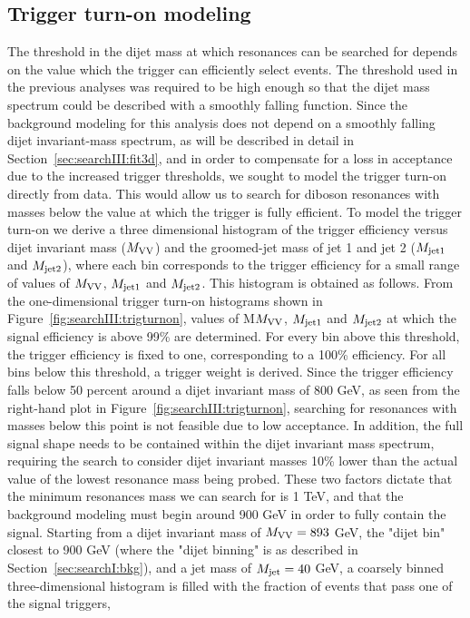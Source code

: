 \subsection{Trigger turn-on modeling}
\label{sec:searchIII:triggermodeling}
The threshold in the dijet mass at which resonances can be searched for depends on the value which the trigger can efficiently select events. The threshold used in the previous analyses was required to be high enough so that the dijet mass spectrum could be described with a smoothly falling function. Since the background modeling for this analysis does not depend on a smoothly falling dijet invariant-mass spectrum, as will be described in detail in Section~\ref{sec:searchIII:fit3d}, and in order to compensate for a loss in acceptance due to the increased trigger thresholds, we sought to model the trigger turn-on directly from data. This would allow us to search for diboson resonances with masses below the value at which the trigger is fully efficient. To model the trigger turn-on we derive a three dimensional histogram of the trigger efficiency versus dijet invariant mass ($M_{\rm VV}$) and the groomed-jet mass of jet 1 and jet 2 ($M_{\rm jet1}$ and $M_{\rm jet2}$), where each bin corresponds to the trigger efficiency for a small range of values of $M_{\rm VV}$, $M_{\rm jet1}$ and $M_{\rm jet2}$. This histogram is obtained as follows. From the one-dimensional trigger turn-on histograms shown in Figure~\ref{fig:searchIII:trigturnon}, values of M$M_{\rm VV}$, $M_{\rm jet1}$ and $M_{\rm jet2}$ at which the signal efficiency is above 99\% are determined. For every bin above this threshold, the trigger efficiency is fixed to one, corresponding to a 100\% efficiency. For all bins below this threshold, a trigger weight is derived. Since the trigger efficiency falls below 50 percent around a dijet invariant mass of 800 GeV, as seen from the right-hand plot in Figure~\ref{fig:searchIII:trigturnon}, searching for resonances with masses below this point is not feasible due to low acceptance. In addition, the full signal shape needs to be contained within the dijet invariant mass spectrum, requiring the search to consider dijet invariant masses 10\% lower than the actual value of the lowest resonance mass being probed. These two factors dictate that the minimum resonances mass we can search for is 1 TeV, and that the background modeling must begin around 900 GeV in order to fully contain the signal. Starting from a dijet invariant mass of $M_{\rm VV}=893$ GeV, the "dijet bin" closest to 900 GeV (where the "dijet binning" is as described in Section~\ref{sec:searchI:bkg}), and a jet mass of $M_{\rm jet}=40$ GeV, a coarsely binned three-dimensional histogram is filled with the fraction of events that pass one of the signal triggers,

